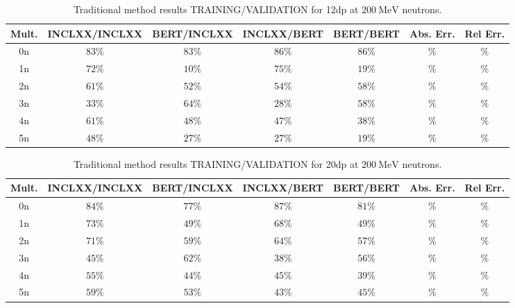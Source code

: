 \documentclass[10pt,a4paper]{report}
\newcommand{\MeV}[0]{\ \textrm{MeV}}
\begin{document}
\begin{table}[htbp] 
\centering
\caption{Traditional method results TRAINING/VALIDATION for \textrm{12dp} at ${200 \MeV}$ neutrons.}
\label{tab:12dp200}
\begin{tabular}{| c | c c c c | c c |} 
\hline
Mult. & INCLXX/INCLXX & BERT/INCLXX & INCLXX/BERT & BERT/BERT & Abs. Err. & Rel Err.   \\
\hline
0n    & ${83 \%}$     & ${83 \%}$   & ${86 \%}$   & ${86 \%}$ & ${ \%}$  & ${ \%}$ \\
1n    & ${72 \%}$     & ${10 \%}$   & ${75 \%}$   & ${19 \%}$ & ${ \%}$  & ${ \%}$ \\
2n    & ${61 \%}$     & ${52 \%}$   & ${54 \%}$   & ${58 \%}$ & ${ \%}$  & ${ \%}$ \\
3n    & ${33 \%}$     & ${64 \%}$   & ${28 \%}$   & ${58 \%}$ & ${ \%}$  & ${ \%}$ \\
4n    & ${61 \%}$     & ${48 \%}$   & ${47 \%}$   & ${38 \%}$ & ${ \%}$  & ${ \%}$ \\
5n    & ${48 \%}$     & ${27 \%}$   & ${27 \%}$   & ${19 \%}$ & ${ \%}$  & ${ \%}$  \\
\hline
\end{tabular}
\end{table}


\begin{table}[htbp] 
\centering
\caption{Traditional method results TRAINING/VALIDATION for \textrm{20dp} at ${200 \MeV}$ neutrons.}
\label{tab:20dp200}
\begin{tabular}{| c | c c c c | c c |} 
\hline
Mult. & INCLXX/INCLXX & BERT/INCLXX & INCLXX/BERT & BERT/BERT & Abs. Err. & Rel Err.   \\
\hline
0n    & ${84 \%}$     & ${77 \%}$   & ${87 \%}$   & ${81 \%}$ & ${ \%}$  & ${ \%}$ \\
1n    & ${73 \%}$     & ${49 \%}$   & ${68 \%}$   & ${49 \%}$ & ${ \%}$  & ${ \%}$ \\
2n    & ${71 \%}$     & ${59 \%}$   & ${64 \%}$   & ${57 \%}$ & ${ \%}$  & ${ \%}$ \\
3n    & ${45 \%}$     & ${62 \%}$   & ${38 \%}$   & ${56 \%}$ & ${ \%}$  & ${ \%}$ \\
4n    & ${55 \%}$     & ${44 \%}$   & ${45 \%}$   & ${39 \%}$ & ${ \%}$  & ${ \%}$ \\
5n    & ${59 \%}$     & ${53 \%}$   & ${43 \%}$   & ${45 \%}$ & ${ \%}$  & ${ \%}$  \\
\hline
\end{tabular}
\end{table}
\end{document}
